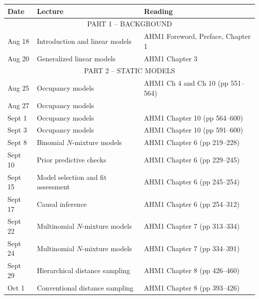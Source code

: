 \documentclass[12pt]{article}
\begin{document}
\begin{center}
\begin{tabular}[c]{lll}
\hline \hline
{\bf Date} & {\bf Lecture}                            & {\bf Reading}                     \\
\hline
           \multicolumn{3}{c}{PART 1 -- BACKGROUND}                                       \\
\hline
Aug 18     & Introduction and linear models           & AHM1 Foreword, Preface, Chapter 1 \\
Aug 20     & Generalized linear models                & AHM1 Chapter 3                    \\
\hline
           \multicolumn{3}{c}{PART 2 -- STATIC MODELS}                                    \\
\hline
Aug 25     & Occupancy models                         & AHM1 Ch 4 and Ch 10 (pp 551--564) \\
Aug 27     & Occupancy models                         &                                   \\
\hline
Sept 1     & Occupancy models                         & AHM1 Chapter 10 (pp 564--600)     \\
Sept 3     & Occupancy models                         & AHM1 Chapter 10 (pp 591--600)     \\
\hline
Sept 8     & Binomial $N$-mixture models              & AHM1 Chapter 6 (pp 219--228)      \\
Sept 10    & Prior predictive checks                  & AHM1 Chapter 6 (pp 229--245)      \\
\hline
Sept 15    & Model selection and fit assessment       & AHM1 Chapter 6 (pp 245--254)      \\
Sept 17    & Causal inference                         & AHM1 Chapter 6 (pp 254--312)      \\
\hline
Sept 22    & Multinomial $N$-mixture models           & AHM1 Chapter 7 (pp 313--334)      \\
Sept 24    & Multinomial $N$-mixture models           & AHM1 Chapter 7 (pp 334--391)      \\
\hline
Sept 29    & Hierarchical distance sampling           & AHM1 Chapter 8 (pp 426--460)      \\
Oct 1      & Conventional distance sampling           & AHM1 Chapter 8 (pp 393--426)      \\

\end{tabular}
\end{center}
\end{document}

